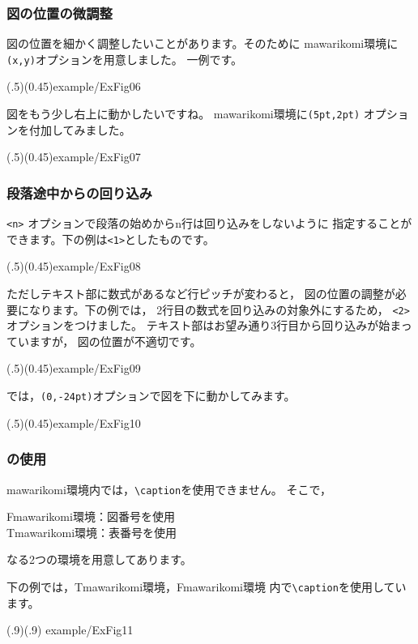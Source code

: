 \documentclass[fleqn,a4j]{jarticle}
\begin{document}
\subsubsection{図の位置の微調整}
図の位置を細かく調整したいことがあります。そのために
\textsf{mawarikomi}環境に\verb/(x,y)/オプションを用意しました。
一例です。

(.5)(0.45){example/ExFig06}

図をもう少し右上に動かしたいですね。
\textsf{mawarikomi}環境に\verb/(5pt,2pt)/ オプションを付加してみました。

(.5)(0.45){example/ExFig07}

\subsubsection{段落途中からの回り込み}
\verb/<n>/ オプションで段落の始めからn行は回り込みをしないように
指定することができます。下の例は\verb/<1>/としたものです。

(.5)(0.45){example/ExFig08}
\bigskip

ただしテキスト部に数式があるなど行ピッチが変わると，
図の位置の調整が必要になります。下の例では，
2行目の数式を回り込みの対象外にするため，
\texttt{<2>}オプションをつけました。
テキスト部はお望み通り3行目から回り込みが始まっていますが，
図の位置が不適切です。

\showexample[図位置の調整が必要](.5)(0.45){example/ExFig09}

では，\verb/(0,-24pt)/オプションで図を下に動かしてみます。

\showexample[図位置の調整後](.5)(0.45){example/ExFig10}

\subsubsection{ の使用}
\textsf{mawarikomi}環境内では，\verb/\caption/を使用できません。
そこで，
\begin{jquote}
  \textsf{Fmawarikomi}環境：図番号を使用\\
  \textsf{Tmawarikomi}環境：表番号を使用
\end{jquote}
なる2つの環境を用意してあります。

下の例では，\textsf{Tmawarikomi}環境，\textsf{Fmawarikomi}環境
内で\verb/\caption/を使用しています。

(.9)(.9){%
  example/ExFig11}
\bigskip
\end{document}
